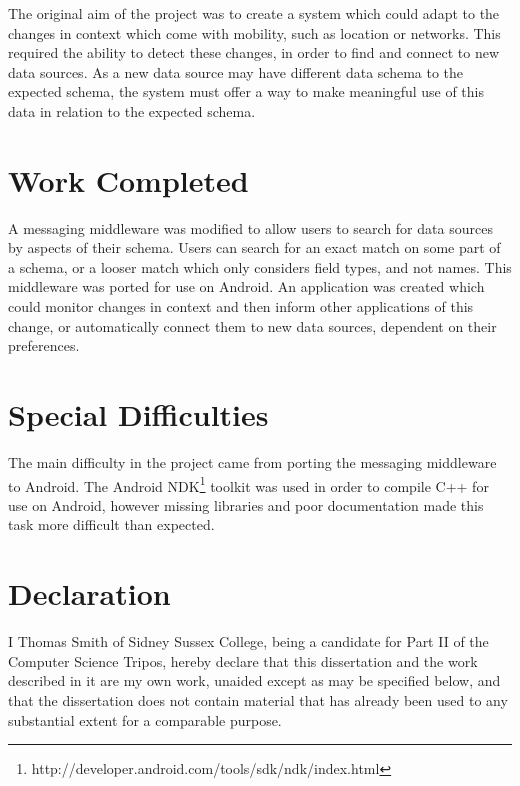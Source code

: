 \documentclass[12pt,twoside,notitlepage]{report}
\begin{document}
The original aim of the project was to create a system which could adapt to the changes in context which come with mobility, such as location or networks. 
This required the ability to detect these changes, in order to find and connect to new data sources. 
As a new data source may have different data schema to the expected schema, the system must offer a way to make meaningful use of this data in relation to the expected schema.

\section*{Work Completed}

A messaging middleware was modified to allow users to search for data sources by aspects of their schema. Users can search for an exact match on some part of a schema, or a looser match which only considers field types, and not names.
This middleware was ported for use on Android. An application was created which could monitor changes in context and then inform other applications of this change, or automatically connect them to new data sources, dependent on their preferences.

\section*{Special Difficulties}

The main difficulty in the project came from porting the messaging middleware to Android. The Android NDK\footnote{http://developer.android.com/tools/sdk/ndk/index.html} toolkit was used in order to compile C++ for use on Android, however missing libraries and poor documentation made this task more difficult than expected.
 
\newpage
\section*{Declaration}

I Thomas Smith of Sidney Sussex College, being a candidate for Part II of the Computer
Science Tripos, hereby declare that this dissertation and the work described in it are my own work,
unaided except as may be specified below, and that the dissertation
does not contain material that has already been used to any substantial
extent for a comparable purpose.

\bigskip
{}

\bigskip
{}

\cleardoublepage
\end{document}
